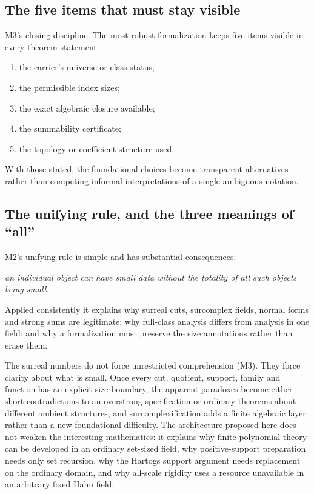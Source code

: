 \documentclass[11pt,letterpaper]{article}
\numberwithin{equation}{section}
\theoremstyle{definition}
\theoremstyle{remark}
\begin{document}
\subsection{The five items that must stay visible}
\label{found:sub:fiveitems}
M3's closing discipline. The most robust formalization keeps five items visible
in every theorem statement:
\begin{enumerate}
\item the carrier's universe or class status;
\item the permissible index sizes;
\item the exact algebraic closure available;
\item the summability certificate;
\item the topology or coefficient structure used.
\end{enumerate}
With those stated, the foundational choices become transparent alternatives
rather than competing informal interpretations of a single ambiguous notation.

\subsection{The unifying rule, and the three meanings of ``all''}
\label{found:sub:unifying}
M2's unifying rule is simple and has substantial consequences:
\begin{center}
\emph{an individual object can have small data without the totality of all such
objects being small.}
\end{center}
Applied consistently it explains why surreal cuts, surcomplex fields, normal
forms and strong sums are legitimate; why full-class analysis differs from
analysis in one field; and why a formalization must preserve the size
annotations rather than erase them.

The surreal numbers do not force unrestricted comprehension (M3). They force
clarity about what is small. Once every cut, quotient, support, family and
function has an explicit size boundary, the apparent paradoxes become either
short contradictions to an overstrong specification or ordinary theorems about
different ambient structures, and surcomplexification adds a finite algebraic
layer rather than a new foundational difficulty. The architecture proposed here
does not weaken the interesting mathematics: it explains why finite polynomial
theory can be developed in an ordinary set-sized field, why positive-support
preparation needs only set recursion, why the Hartogs support argument needs
replacement on the ordinary domain, and why all-scale rigidity uses a resource
unavailable in an arbitrary fixed Hahn field.
\end{document}
